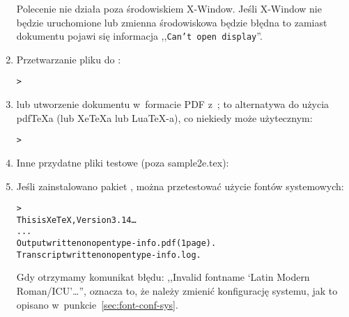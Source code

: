 \documentclass{article}
\renewcommand{\samp}[1]{,,\texttt{#1}''}  %
\begin{document}
\begin{enumerate}
Polecenie  nie działa poza środowiskiem
X-Window. Jeśli X-Window nie będzie uruchomione lub zmienna
środowiskowa   będzie błędna to zamiast
dokumentu pojawi się informacja \samp{Can't open display}.

\item Przetwarzanie pliku \dvi{} do \PS{}:
\begin{alltt}
> 
\end{alltt}

\item lub utworzenie dokumentu  w~formacie PDF z~\dvi{}; to alternatywa
do użycia pdf\TeX\-a (lub Xe\TeX\-a lub Lua\TeX-a), co niekiedy może użytecznym:

\begin{alltt}
> 
\end{alltt}

\item Inne przydatne pliki testowe (poza sample2e.tex):

\item Jeśli zainstalowano pakiet , można przetestować
 użycie fontów systemowych:
\begin{alltt}
> 
This is XeTeX, Version 3.14\dots
...
Output written on opentype-info.pdf (1 page).
Transcript written on opentype-info.log.
\end{alltt}
Gdy otrzymamy komunikat błędu:
,,Invalid fontname `Latin Modern Roman/ICU'\dots'', oznacza to, że
należy zmienić konfigurację systemu, jak to opisano
w~punkcie~\ref{sec:font-conf-sys}.
\end{enumerate}
\end{document}
